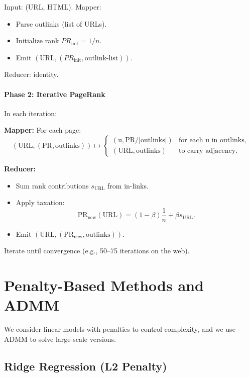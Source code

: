 \documentclass[11pt]{article}
\begin{document}
Input: (URL, HTML).  
Mapper:
\begin{itemize}
    \item Parse outlinks (list of URLs).
    \item Initialize rank $PR_{\text{init}} = 1/n$.
    \item Emit $(\text{URL}, (PR_{\text{init}}, \text{outlink-list}))$.
\end{itemize}

Reducer: identity.

\paragraph{Phase 2: Iterative PageRank}

In each iteration:

\textbf{Mapper:} For each page:
\[
    (\text{URL}, (\text{PR}, \text{outlinks})) \mapsto
\begin{cases}
    (\text{u}, \text{PR}/|\text{outlinks}|) & \text{for each u in outlinks},\\
    (\text{URL}, \text{outlinks}) & \text{to carry adjacency}.
\end{cases}
\]

\textbf{Reducer:}
\begin{itemize}
    \item Sum rank contributions $s_{\text{URL}}$ from in-links.
    \item Apply taxation:
    \[
        \text{PR}_{\text{new}}(\text{URL}) = (1-\beta)\frac{1}{n} + \beta s_{\text{URL}}.
    \]
    \item Emit $(\text{URL}, (\text{PR}_{\text{new}}, \text{outlinks}))$.
\end{itemize}

Iterate until convergence (e.g., 50--75 iterations on the web).

\section{Penalty-Based Methods and ADMM}

We consider linear models with penalties to control complexity, and we use ADMM to solve large-scale versions.

\subsection{Ridge Regression (L2 Penalty)}
\end{document}
